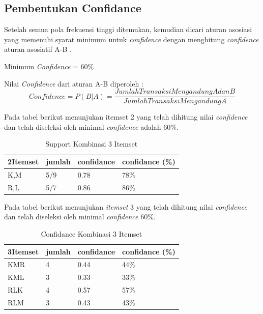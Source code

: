\subsection{Pembentukan Confidance}
\par Setelah semua pola frekuensi tinggi ditemukan, kemudian dicari aturan asosiasi yang memenuhi syarat minimum untuk \textit{confidence} dengan menghitung \textit{confidence} aturan asosiatif A-B . 
\par Minimum \textit{Confidence} = 60\% 
\par Nilai \textit{Confidence} dari aturan A-B diperoleh :
\begin{equation}
Confidence = P(B|A) =\frac{Jumlah Transaksi Mengandung A dan B}{Jumlah Transaksi Mengandung A} 
\end{equation}
\par Pada tabel berikut menunjukan itemset 2 yang telah dihitung nilai \textit{confidence} dan telah diseleksi oleh minimal \textit{confidence} adalah 60\%.
\begin{table}[!ht]
\caption{Support Kombinasi 3 Itemset}
\centering
\begin{tabular}{|l|l|l|l|}
\hline
2Itemset & jumlah & confidance & confidance (\%) \\ \hline
K,M      & 5/9    & 0.78       & 78\%            \\ \hline
R,L      & 5/7    & 0.86       & 86\%            \\ \hline
\end{tabular}
\end{table}

\par Pada tabel berikut menunjukan \textit{itemset} 3 yang telah dihitung nilai \textit{confidence} dan telah diseleksi oleh minimal \textit{confidence} 60\%.
\begin{table}[!ht]
\caption{Confidance Kombinasi 3 Itemset}
\centering
\begin{tabular}{|l|l|l|l|}
\hline
3Itemset & jumlah & confidance & confidance (\%) \\ \hline
KMR      & 4      & 0.44       & 44\%            \\ \hline
KML      & 3      & 0.33       & 33\%            \\ \hline
RLK      & 4      & 0.57       & 57\%            \\ \hline
RLM      & 3      & 0.43       & 43\%            \\ \hline
\end{tabular}
\end{table}

